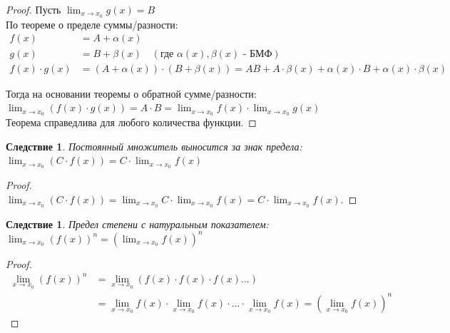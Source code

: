 \documentclass[12pt, a4paper]{article}
\newtheorem{corollary}[theorem]{Следствие}
\theoremstyle{remark}
\begin{document}
	\begin{proof}
		Пусть \(\lim_{x \to x_0} g(x) = B\) \\
		
		По теореме о пределе суммы/разности: \\
		
		\begin{align*}
			f(x) &= A + \alpha(x) \\
			g(x) &= B + \beta(x) \quad (\text{где } \alpha(x), \beta(x) \text{ - БМФ}) \\
			f(x) \cdot g(x) &= (A + \alpha(x)) \cdot(B + \beta(x)) = AB + A \cdot \beta(x) + \alpha(x) \cdot B + \alpha(x) \cdot \beta(x)
		\end{align*}
		
		Тогда на основании теоремы о обратной сумме/разности: \\
		
		$\lim_{x \to x_0}(f(x) \cdot g(x)) = A \cdot B = \lim_{x \to x_0} f(x) \cdot \lim_{x \to x_0} g(x)$ \\
		
		Теорема справедлива для любого количества функции.
	\end{proof}
	
	\newpage
	
	\begin{corollary}
		Постоянный множитель выносится за знак предела: \\
		
		$\lim_{x \to x_0} (C \cdot f(x)) = C \cdot \lim_{x \to x_0} f(x)$
	\end{corollary}
	
	\begin{proof}
		$\lim_{x \to x_0} (C \cdot f(x)) = \lim_{x \to x_0} C \cdot \lim_{x \to x_0} f(x) = C \cdot \lim_{x \to x_0} f(x)$.
	\end{proof}
	
	\begin{corollary}
		Предел степени с натуральным показателем: \\
		
		$\lim_{x \to x_0} (f(x))^n = (\lim_{x \to x_0} f(x))^n $
	\end{corollary}
	
	\begin{proof}
		\begin{align*}
			\lim_{x \to x_0} (f(x))^n &= \lim_{x \to x_0} (f(x) \cdot f(x) \cdot f(x) ...) \\
			&= \lim_{x \to x_0} f(x) \cdot \lim_{x \to x_0} f(x) \cdot ... \cdot \lim_{x \to x_0} f(x) = (\lim_{x \to x_0} f(x))^n
		\end{align*}
	\end{proof}
	
\end{document}
